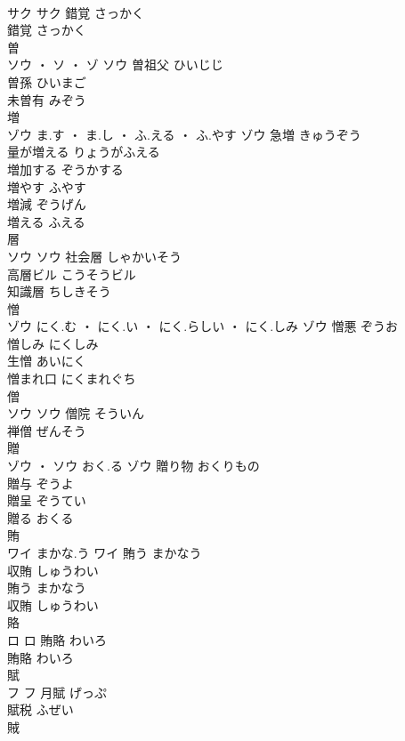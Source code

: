 \documentclass[8pt]{extreport}
\begin{document}
\begin{CJK}{UTF8}{min}
\\	サク		サク	錯覚	さっかく	
\\	錯覚	さっかく	
\\	曽	
\\	ソウ ・ ソ ・ ゾ		ソウ													曽祖父	ひいじじ	
\\	曽孫	ひいまご	
\\	未曽有	みぞう	
\\	増	
\\	ゾウ	ま.す ・ ま.し ・ ふ.える ・ ふ.やす	ゾウ	急増	きゅうぞう	
\\	量が増える	りょうがふえる	
\\	増加する	ぞうかする	
\\	増やす	ふやす	
\\	増減	ぞうげん	
\\	増える	ふえる	
\\	層	
\\	ソウ		ソウ	社会層	しゃかいそう	
\\	高層ビル	こうそうビル	
\\	知識層	ちしきそう	
\\	憎	
\\	ゾウ	にく.む ・ にく.い ・ にく.らしい ・ にく.しみ	ゾウ	憎悪	ぞうお	
\\	憎しみ	にくしみ	
\\	生憎	あいにく	
\\	憎まれ口	にくまれぐち	
\\	僧	
\\	ソウ		ソウ	僧院	そういん	
\\	禅僧	ぜんそう	
\\	贈	
\\	ゾウ ・ ソウ	おく.る	ゾウ	贈り物	おくりもの	
\\	贈与	ぞうよ	
\\	贈呈	ぞうてい	
\\	贈る	おくる	
\\	賄	
\\	ワイ	まかな.う	ワイ	賄う	まかなう	
\\	収賄	しゅうわい	
\\	賄う	まかなう	
\\	収賄	しゅうわい	
\\	賂	
\\	ロ		ロ	賄賂	わいろ	
\\	賄賂	わいろ	
\\	賦	
\\	フ		フ	月賦	げっぷ	
\\	賦税	ふぜい	
\\	賊	

\end{CJK}
\end{document}
